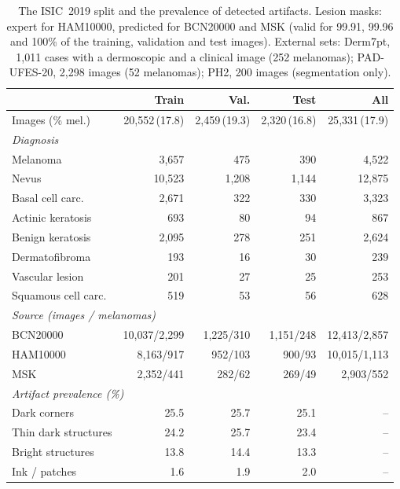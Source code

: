 \documentclass[conference]{IEEEtran}
\begin{document}
\begin{table}[t]
\caption{The ISIC~2019 split and the prevalence of detected artifacts. Lesion masks: expert for HAM10000, predicted for BCN20000 and MSK (valid for 99.91, 99.96 and 100\% of the training, validation and test images). External sets: Derm7pt, 1{,}011 cases with a dermoscopic and a clinical image (252 melanomas); PAD-UFES-20, 2{,}298 images (52 melanomas); PH2, 200 images (segmentation only).}
\label{tab:dist}
\centering
\scriptsize
\setlength{\tabcolsep}{1.6pt}
\begin{tabular}{lrrrr}
\toprule
& Train & Val. & Test & All \\
\midrule
Images (\% mel.) & 20{,}552\,(17.8) & 2{,}459\,(19.3) & 2{,}320\,(16.8) & 25{,}331\,(17.9) \\
\midrule
\multicolumn{5}{l}{\emph{Diagnosis}} \\
Melanoma & 3{,}657 & 475 & 390 & 4{,}522 \\
Nevus & 10{,}523 & 1{,}208 & 1{,}144 & 12{,}875 \\
Basal cell carc. & 2{,}671 & 322 & 330 & 3{,}323 \\
Actinic keratosis & 693 & 80 & 94 & 867 \\
Benign keratosis & 2{,}095 & 278 & 251 & 2{,}624 \\
Dermatofibroma & 193 & 16 & 30 & 239 \\
Vascular lesion & 201 & 27 & 25 & 253 \\
Squamous cell carc. & 519 & 53 & 56 & 628 \\
\midrule
\multicolumn{5}{l}{\emph{Source (images / melanomas)}} \\
BCN20000 & 10{,}037/2{,}299 & 1{,}225/310 & 1{,}151/248 & 12{,}413/2{,}857 \\
HAM10000 & 8{,}163/917 & 952/103 & 900/93 & 10{,}015/1{,}113 \\
MSK & 2{,}352/441 & 282/62 & 269/49 & 2{,}903/552 \\
\midrule
\multicolumn{5}{l}{\emph{Artifact prevalence (\%)}} \\
Dark corners & 25.5 & 25.7 & 25.1 & -- \\
Thin dark structures & 24.2 & 25.7 & 23.4 & -- \\
Bright structures & 13.8 & 14.4 & 13.3 & -- \\
Ink / patches & 1.6 & 1.9 & 2.0 & -- \\
\bottomrule
\end{tabular}
\end{table}
\end{document}
